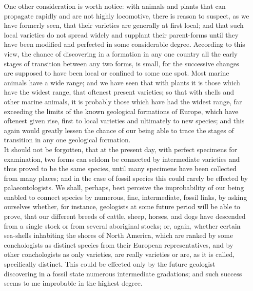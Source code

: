 \indent One other consideration is worth notice: with animals and plants that can propagate rapidly and are not highly locomotive, there is reason to suspect, as we have formerly seen, that their varieties are generally at first local; and that such local varieties do not spread widely and supplant their parent-forms until they have been modified and perfected in some considerable degree. According to this view, the chance of discovering in a formation in any one country all the early stages of transition between any two forms, is small, for the successive changes are supposed to have been local or confined to some one spot. Most marine animals have a wide range; and we have seen that with plants it is those which have the widest range, that oftenest present varieties; so that with shells and other marine animals, it is probably those which have had the widest range, far exceeding the limits of the known geological formations of Europe, which have oftenest given rise, first to local varieties and ultimately to new species; and this again would greatly lessen the chance of our being able to trace the stages of transition in any one geological formation.\\
\indent It should not be forgotten, that at the present day, with perfect specimens for examination, two forms can seldom be connected by intermediate varieties and thus proved to be the same species, until many specimens have been collected from many places; and in the case of fossil species this could rarely be effected by palaeontologists. We shall, perhaps, best perceive the improbability of our being enabled to connect species by numerous, fine, intermediate, fossil links, by asking ourselves whether, for instance, geologists at some future period will be able to prove, that our different breeds of cattle, sheep, horses, and dogs have descended from a single stock or from several aboriginal stocks; or, again, whether certain sea-shells inhabiting the shores of North America, which are ranked by some conchologists as distinct species from their European representatives, and by other conchologists as only varieties, are really varieties or are, as it is called, specifically distinct. This could be effected only by the future geologist discovering in a fossil state numerous intermediate gradations; and such success seems to me improbable in the highest degree.\\
